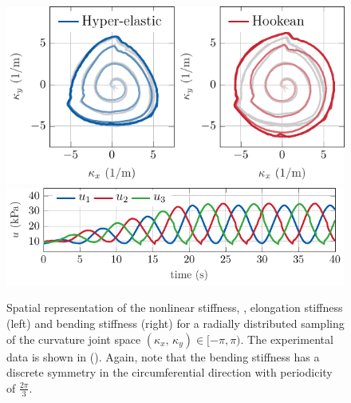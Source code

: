 \begin{figure}[!t]
   \centering
   \includegraphics*{./pdf/thesis-figure-4-17-1.pdf}
   \includegraphics*{./pdf/thesis-figure-4-17-2.pdf}
   \vspace{-0.25cm}
   \caption{ Spatial representation of the nonlinear stiffness, \ie,  elongation stiffness (left) and bending stiffness (right) for a radially distributed sampling of the curvature joint space $(\kappa_x,\,\kappa_y) \in [-\pi,\pi)$. The experimental data is shown in (). Again, note that the bending stiffness has a discrete symmetry in the circumferential direction with periodicity of $\tfrac{2\pi}{3}$.}
   \vspace{-0.1cm}
   \label{fig:C2:openloop_2D}
 \end{figure}

